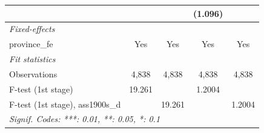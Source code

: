 \begin{table}[htbp]
\begin{tabular}{lcccc}
                                       &                        &                        & (1.096)                &   \\   
      \midrule
      \emph{Fixed-effects}\\
      province\_fe                     & Yes                    & Yes                    & Yes                    & Yes\\  
      \midrule
      \emph{Fit statistics}\\
      Observations                     & 4,838                  & 4,838                  & 4,838                  & 4,838\\  
      F-test (1st stage)               & 19.261                 &                        & 1.2004                 & \\  
      F-test (1st stage), ass1900s\_d  &                        & 19.261                 &                        & 1.2004\\  
      \midrule \midrule
      \multicolumn{5}{l}{\emph{Signif. Codes: ***: 0.01, **: 0.05, *: 0.1}}\\
   \end{tabular}
\end{table}


